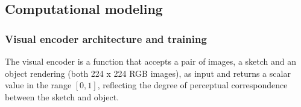 \documentclass[9pt,twocolumn,twoside]{pnas-new}
\newcommand{\mwu}[1]{{\color{green}{[mwu: #1]}}}
\begin{document}
{%

\subsection*{Computational modeling}



\subsubsection*{Visual encoder architecture and training}


The visual encoder is a function that accepts a pair of images, a sketch and an object rendering (both 224 x 224 RGB images), as input and returns a scalar value in the range $[0,1]$, reflecting the degree of perceptual correspondence between the sketch and object. 

}
\end{document}
